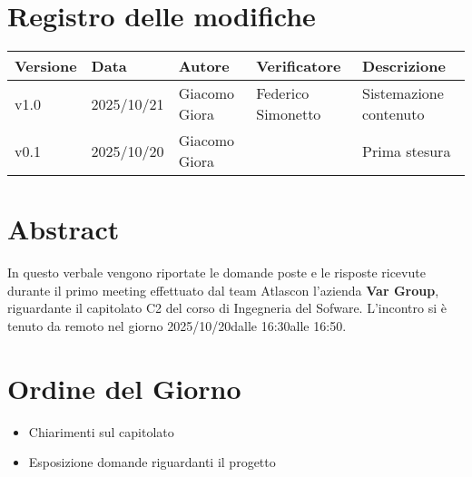 \documentclass[a4paper,12pt]{article}
\newcommand{\Gruppo}{Atlas}
\newcommand{\DataVerbale}{2025/10/20}
\newcommand{\OraInizio}{16:30}
\newcommand{\OraFine}{16:50}
\newcommand{\AbstractVerbale}{%
In questo verbale vengono riportate le domande poste e le risposte ricevute durante il primo meeting effettuato dal team \Gruppo \space con l'azienda \textbf{Var Group}, riguardante il capitolato C2 del corso di Ingegneria del Sofware. L'incontro si è tenuto da remoto nel giorno \DataVerbale \space dalle \OraInizio \space alle \OraFine.
}
\newcommand{\VersioneVerbale}{v1.0} %
\begin{document}
\section*{Registro delle modifiche}{
    \begin{center} 
        \begin{tabular}{|l|l|l|l|l|}
            \hline
            \textbf{Versione} & \textbf{Data} & \textbf{Autore} & \textbf{Verificatore} & \textbf{Descrizione} \\
            \hline
            \VersioneVerbale & 2025/10/21 & Giacomo Giora & Federico Simonetto & Sistemazione contenuto\\
            \hline
            v0.1 & 2025/10/20 & Giacomo Giora &  & Prima stesura\\ 
            \hline
        \end{tabular}
    \end{center}
}

\newpage

\tableofcontents

\newpage
\section{Abstract}{
    \begin{minipage}{0.9\textwidth}
        \small
        \AbstractVerbale
    \end{minipage}
}


\section{Ordine del Giorno}{
    \begin{itemize}
        \item Chiarimenti sul capitolato
        \item Esposizione domande riguardanti il progetto
    \end{itemize}
}
\end{document}
